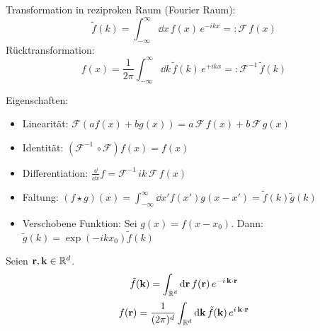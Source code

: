 \begin{framedprop}
	Transformation in reziproken Raum (Fourier Raum):
	\[
	\tilde{f}(k) = \int_{-\infty}^{\infty} \dd x\, f(x)\, e^{-ikx} =: \mathcal{F}\, f(x)
	\]
	Rücktransformation:
	\[
	f(x) = \frac{1}{2\pi} \int_{-\infty}^{\infty} \dd k\, \tilde{f}(k)\, e^{+ikx} =: \mathcal{F}^{-1}\, \tilde{f}(k)
 	\]
\end{framedprop}

Eigenschaften:
\begin{itemize}
	\item Linearität: $\mathcal{F}(a f(x) + b g(x)) = a\, \mathcal{F}\, f(x) + b\, \mathcal{F}\, g(x)$
	\item Identität: $(\mathcal{F}^{-1}\,\circ \mathcal{F}) f(x) = f(x)$
	\item Differentiation: $\frac{\dd}{\dd x}f = \mathcal{F}^{-1}\, ik\, \mathcal{F}\, f(x)$
	\item Faltung: $(f \star g)(x) = \int_{-\infty}^{\infty} \dd x' f(x') g(x - x') = \tilde{f}(k)\tilde{g}(k)$
	\item Verschobene Funktion: Sei $g(x) = f(x-x_0)$. Dann: $\tilde{g}(k) = \exp(-ikx_0)\tilde{f}(k)$
\end{itemize}

\begin{framedprop}
Seien $\mathbf{r}, \mathbf{k} \in \mathbb{R}^d$.
\[
\tilde{f}(\mathbf{k}) = \int_{\mathbb{R}^d} \mathrm{d}\mathbf{r}\, f(\mathbf{r})\, e^{-i\,\mathbf{k}\cdot\mathbf{r}}
\]
\[
f(\mathbf{r}) = \frac{1}{(2\pi)^d} \int_{\mathbb{R}^d} \mathrm{d}\mathbf{k}\, \tilde{f}(\mathbf{k})\, e^{i\,\mathbf{k}\cdot\mathbf{r}}
\]
	
\end{framedprop}